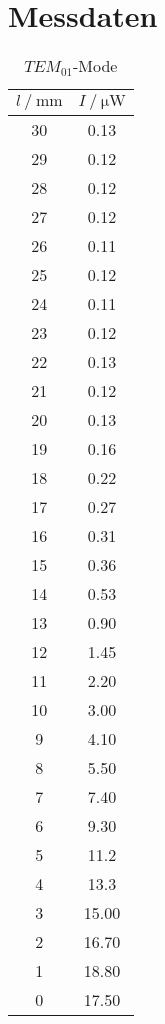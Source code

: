 \section{Messdaten}
\label{sec:Messdaten}

\begin{table}
    \centering
    \caption{$TEM_{01}$-Mode}
    \label{tab:TEM01}
    \begin{tabular}[t]{S S}
        \toprule
        $l \mathbin{/} \si{\milli\m}$ & $I \mathbin{/} \si{\micro\watt}$ \\
        \midrule

        30 & 0.13   \\
        29 & 0.12   \\
        28 & 0.12   \\
        27 & 0.12   \\
        26 & 0.11   \\
        25 & 0.12   \\
        24 & 0.11   \\
        23 & 0.12   \\
        22 & 0.13   \\
        21 & 0.12   \\
        20 & 0.13   \\
        19 & 0.16   \\
        18 & 0.22   \\
        17 & 0.27   \\
        16 & 0.31   \\
        15 & 0.36   \\
        14 & 0.53   \\
        13 & 0.90   \\
        12 & 1.45   \\
        11 & 2.20   \\
        10 & 3.00   \\
        9 & 4.10    \\
        8 & 5.50    \\
        7 & 7.40    \\
        6 & 9.30    \\
        5 & 11.2    \\
        4 & 13.3    \\
        3 & 15.00   \\
        2 & 16.70   \\
        1 & 18.80   \\
        0 & 17.50   \\


\end{tabular}
\end{table}
